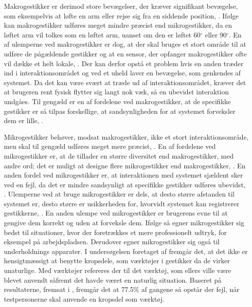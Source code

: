 Makrogestikker er derimod store bevægelser, der kræver signifikant bevægelse, som eksempelvis at løfte en arm eller rejse sig fra en siddende position, \parencite[s. 6]{PDF:UsabilityofMicroVsMacroGestures}. Ifølge \textcite[s. 9]{PDF:UsabilityofMicroVsMacroGestures} kan makrogestikker udføres meget mindre præcist end mikrogestikker, da en løftet arm vil tolkes som en løftet arm, uanset om den er løftet 60$^{\circ}$ eller 90$^{\circ}$. En af ulemperne ved makrogestikker er dog, at der skal bruges et stort område til at udføre de pågældende gestikker og at en sensor, der opfanger makrogestikker ofte vil dække et helt lokale, \parencite[s. 9]{PDF:UsabilityofMicroVsMacroGestures}. Der kan derfor opstå et problem hvis en anden træder ind i interaktionsområdet og ved et uheld laver en bevægelse, som genkendes af systemet. Da det kan være svært at træde ud af interaktionsområdet, kræver det at brugeren rent fysisk flytter sig langt nok væk, så en ubevidst interaktion undgåes. Til gengæld er en af fordelene ved makrogestikker, at de specifikke gestikker er så tilpas forskellige, at sandsynligheden for at systemet forveksler dem er lille, \parencite[s. 9]{PDF:UsabilityofMicroVsMacroGestures}.  

Mikrogestikker behøver, modsat makrogestikker, ikke et stort interaktionsområde, men skal til gengæld udføres meget mere præcist, \parencite[s. 10]{PDF:UsabilityofMicroVsMacroGestures}. En af fordelene ved mikrogestikker er, at de tillader en større diversitet end makrogestikker, med andre ord; det er muligt at designe flere mikrogestikker end makrogestikker, \parencite[s. 10]{PDF:UsabilityofMicroVsMacroGestures}. En anden fordel ved mikrogestikker er, at interaktionen med systemet sjældent sker ved en fejl, da det er mindre sandsynligt at specifikke gestikker udføres ubevidst, \parencite[s. 10]{PDF:UsabilityofMicroVsMacroGestures}. Ulemperne ved at bruge mikrogestikker er dels, at desto større afstanden til systemet er, desto større er usikkerheden for, hvorvidt systemet kan registrerer gestikkerne, \parencite[s. 10]{PDF:UsabilityofMicroVsMacroGestures}. En anden ulempe ved mikrogestikker er brugerens evne til at gengive dem korrekt og uden at forveksle dem. Ifølge \textcite[s. 10]{PDF:UsabilityofMicroVsMacroGestures} så egner mikrogestikker sig bedst til situationer, hvor der foretrækkes et mere professionelt udtryk, for eksempel på arbejdspladsen. Derudover egner mikrogestikker sig også til underholdnings apparater.\blankline
%
I undersøgelsen foretaget af \textcite[s. 823]{PDF:UnderstandingNaturalness} fremgår det, at det ikke er hensigtmæssigt at benytte kropsdele, som værktøjer i gestikker da de virker unaturlige. Med værktøjer refereres der til det værktøj, som ellers ville være blevet anvendt såfremt det havde været en naturlig situation. Baseret på resultaterne, fremsat i \textcite[s. 823]{PDF:UnderstandingNaturalness}, fremgår det at 77.5\% af gangene så opstår der fejl, når testpersonerne skal anvende en kropsdel som værktøj.

